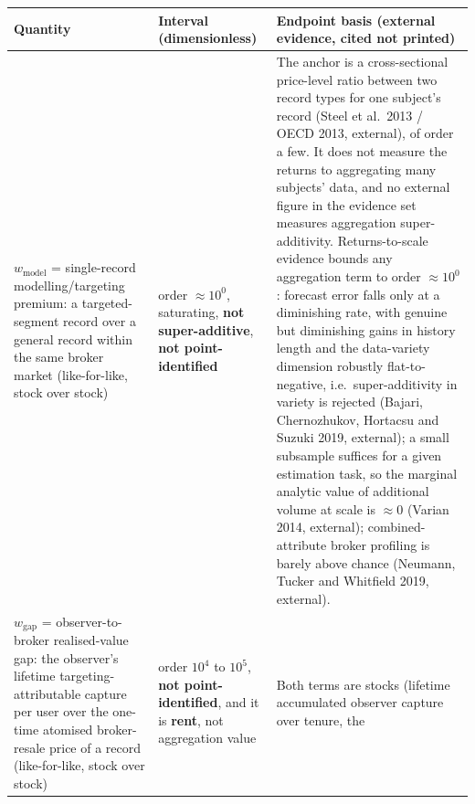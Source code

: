 \documentclass[
  11pt,
]{article}
\newcounter{none} %
\begin{document}
{\def\LTcaptype{none} %
\begin{longtable}[]{@{}
  >{\raggedright\arraybackslash}p{}
  >{\raggedright\arraybackslash}p{}
  >{\raggedright\arraybackslash}p{}@{}}
\toprule\noalign{}
\begin{minipage}[b]{\linewidth}\raggedright
Quantity
\end{minipage} & \begin{minipage}[b]{\linewidth}\raggedright
Interval (dimensionless)
\end{minipage} & \begin{minipage}[b]{\linewidth}\raggedright
Endpoint basis (external evidence, cited not printed)
\end{minipage} \\
\midrule\noalign{}
\endhead
\bottomrule\noalign{}
\endlastfoot
\(w_{\text{model}}\) = single-record modelling/targeting premium: a
targeted-segment record over a general record within the same broker
market (like-for-like, stock over stock) & order \(\approx 10^{0}\),
saturating, \textbf{not super-additive}, \textbf{not point-identified} &
The anchor is a cross-sectional price-level ratio between two record
types for one subject's record (Steel et al.~2013 / OECD 2013,
external), of order a few. It does not measure the returns to
aggregating many subjects' data, and no external figure in the evidence
set measures aggregation super-additivity. Returns-to-scale evidence
bounds any aggregation term to order \(\approx 10^{0}\): forecast error
falls only at a diminishing rate, with genuine but diminishing gains in
history length and the data-variety dimension robustly flat-to-negative,
i.e.~super-additivity in variety is rejected (Bajari, Chernozhukov,
Hortacsu and Suzuki 2019, external); a small subsample suffices for a
given estimation task, so the marginal analytic value of additional
volume at scale is \(\approx 0\) (Varian 2014, external);
combined-attribute broker profiling is barely above chance (Neumann,
Tucker and Whitfield 2019, external). \\
\(w_{\text{gap}}\) = observer-to-broker realised-value gap: the
observer's lifetime targeting-attributable capture per user over the
one-time atomised broker-resale price of a record (like-for-like, stock
over stock) & order \(10^{4}\) to \(10^{5}\), \textbf{not
point-identified}, and it is \textbf{rent}, not aggregation value & Both
terms are stocks (lifetime accumulated observer capture over tenure, the

\end{longtable}}
\end{document}
